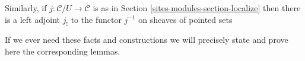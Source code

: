 \medskip\noindent
Similarly, if $j : \mathcal{C}/U \to \mathcal{C}$ is as in
Section \ref{sites-modules-section-localize} then there is a left adjoint $j_!$
to the functor $j^{-1}$ on sheaves of pointed sets

\medskip\noindent
If we ever need these facts and constructions we will precisely
state and prove here the corresponding lemmas.



